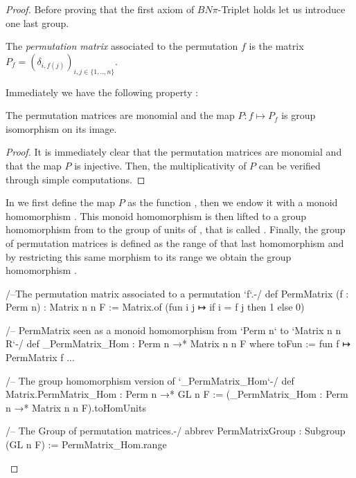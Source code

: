 \begin{proof}

Before proving that the first axiom of $BN\pi$-Triplet holds let us introduce one last group.
\begin{definition}
    The \emph{permutation matrix} associated to the permutation $f$ is the matrix $P_f = \left( \delta_{i,f(j)} \right)_{i,j \in  \{1,..,n\}}$.
\end{definition}

Immediately we have the following property : 

\begin{propriete} \label{prop:permmat}
    The permutation matrices are monomial and the map $P : f \mapsto P_f$ is group isomorphism on its image.
\end{propriete}

\begin{proof}
    It is immediately clear that the permutation matrices are monomial and that the map $P$ is injective. Then, the multiplicativity of $P$ can be verified through simple computations.
\end{proof}

In \Lean we first define the map $P$ as the function , then we endow it with a monoid homomorphism . This monoid homomorphism is then lifted to a group homomorphism from  to the group of units of , that is  called  . Finally,  the group of permutation matrices is defined as the range of that last homomorphism and by restricting this same morphism to its range we obtain the group homomorphism  .
\begin{leancode}
/--The permutation matrix associated to a permutation `f`.-/
def PermMatrix (f : Perm n) : Matrix n n F := 
    Matrix.of (fun i j ↦ if i = f j then 1 else 0)

 /-- PermMatrix seen as a monoid homomorphism from `Perm n` to `Matrix n n R`-/
def _PermMatrix_Hom : Perm n →* Matrix n n F where
  toFun := fun f ↦ PermMatrix f
  ...

/-- The group homomorphism version of `_PermMatrix_Hom`-/
def Matrix.PermMatrix_Hom : Perm n →* GL n F :=
  (_PermMatrix_Hom : Perm n →* Matrix n n F).toHomUnits

/-- The Group of permutation matrices.-/
abbrev PermMatrixGroup : Subgroup (GL n F) := PermMatrix_Hom.range


\end{leancode}
\end{proof}

